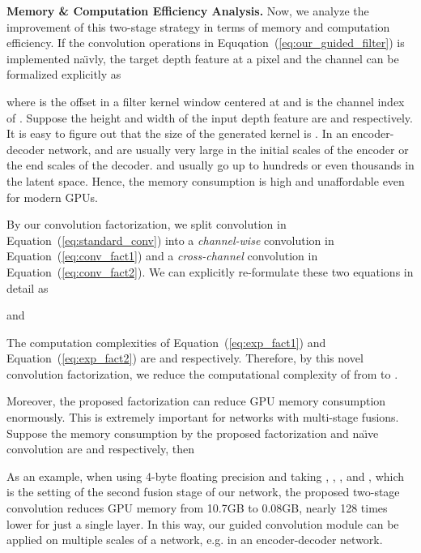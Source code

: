 \documentclass[journal]{IEEEtran}
\begin{document}
\textbf{Memory \& Computation Efficiency Analysis.}
Now, we analyze the improvement of this two-stage strategy in terms of memory and computation efficiency. 
If the convolution operations  in Equqation~(\ref{eq:our_guided_filter}) is implemented na\"{\i}vly,
the target depth feature  at a pixel  and the channel  can be formalized explicitly as 

where  is the offset in a  filter kernel window centered at  and  is the channel index of .
Suppose the height and width of the input depth feature  are  and  respectively.
It is easy to figure out that the size of the generated kernel is .
In an encoder-decoder network,  and  are usually very large in the initial scales of  the encoder or the end scales of the decoder.
 and  usually go up to hundreds or even thousands in the latent space. Hence, the memory consumption is high and unaffordable even for modern GPUs. 

By our convolution factorization,
we split convolution in Equation~(\ref{eq:standard_conv}) into a \emph{channel-wise} convolution in Equation~(\ref{eq:conv_fact1})
and a \emph{cross-channel} convolution in Equation~(\ref{eq:conv_fact2}).
We can explicitly re-formulate these two equations in detail as

 and
  

The computation complexities of Equation~(\ref{eq:exp_fact1}) and Equation~(\ref{eq:exp_fact2}) are  and  respectively.
Therefore,
by this novel convolution factorization,
we reduce the computational complexity of  from  to . 

Moreover, the proposed factorization can reduce GPU memory consumption enormously.
This is extremely important for networks with multi-stage fusions.
Suppose the memory consumption by the proposed factorization and na\"{\i}ve convolution are  and  respectively, then


As an example, when using 4-byte floating precision and taking , , , and ,
which is the setting of the second fusion stage of our network, the proposed two-stage convolution reduces GPU memory from 10.7GB to 0.08GB, nearly 128 times lower for just a single layer.
In this way, our guided convolution module can be applied on multiple scales of a network, e.g. in an encoder-decoder network.
\end{document}
